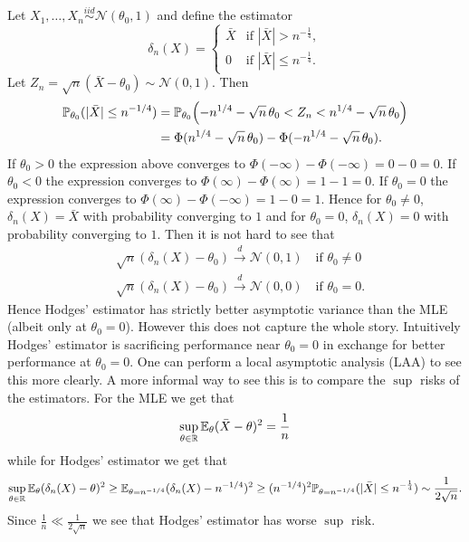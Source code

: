 \begin{example}
	Let $X_1, \dots, X_n \overset{iid}{\sim} \mathcal{N}(\theta_0, 1)$ and define the estimator $$
	\delta_n(X) = \begin{cases}
		\bar X & \text{if } |\bar X| > n^{-\frac{1}{4}}, \\
		0 & \text{if } |\bar X| \leq n^{-\frac{1}{4}}.
	\end{cases}
	$$ 
	Let $Z_n=\sqrt n(\bar X-\theta_0)\sim\mathcal N(0,1)$. Then
	\begin{align*}
	\mathbb{P}_{\theta_0}(|\bar X|\le n^{-1/4})
	&=
	\mathbb{P}_{\theta_0}\!\left(
	-n^{1/4}-\sqrt n\,\theta_0
	<Z_n<
	n^{1/4}-\sqrt n\,\theta_0
	\right) \\
	&=
	\Phi(n^{1/4}-\sqrt n\,\theta_0)
	-
	\Phi(-n^{1/4}-\sqrt n\,\theta_0).
	\end{align*}
	If $\theta_0 > 0$ the expression above converges to $\Phi(-\infty) - \Phi(-\infty) = 0 - 0 = 0$. If $\theta_0 < 0$ the expression converges to $\Phi(\infty) - \Phi(\infty) = 1 - 1 = 0$. If $\theta_0 = 0$ the expression converges to $\Phi(\infty) - \Phi(-\infty) = 1 - 0 = 1$. Hence for $\theta_0 \neq 0$, $\delta_n(X) = \bar X$ with probability converging to $1$ and for $\theta_0 = 0$, $\delta_n(X) = 0$ with probability converging to $1$. Then it is not hard to see that \begin{align*}
		&\sqrt{n} (\delta_n(X) - \theta_0) \overset{d}{\to} \mathcal{N}(0,1) \quad \text{if } \theta_0 \neq 0 \\
		&\sqrt{n} (\delta_n(X) - \theta_0) \overset{d}{\to} \mathcal{N}(0,0) \quad \text{if } \theta_0 = 0.
	\end{align*}
	Hence Hodges' estimator has strictly better asymptotic variance than the MLE (albeit only at $\theta_0 = 0$). However this does not capture the whole story. Intuitively Hodges' estimator is sacrificing performance near $\theta_0 = 0$ in exchange for better performance at $\theta_0 = 0$. One can perform a local asymptotic analysis (LAA) to see this more clearly. A more informal way to see this is to compare the $\sup$ risks of the estimators. For the MLE we get that \[
		\sup_{\theta \in \mathbb{R}} \mathbb{E}_{\theta} (\bar X - \theta)^2 = \frac{1}{n}
	\] while for Hodges' estimator we get that \[
		\sup_{\theta \in \mathbb{R}} \mathbb{E}_{\theta} (\delta_n(X) - \theta)^2 \geq \mathbb{E}_{\theta = n^{-1/4}} (\delta_n(X) - n^{-1/4})^2 \geq (n^{-1/4})^2 \mathbb{P}_{\theta = n^{-1/4}}(|\bar X| \leq n^{-\frac{1}{4}}) \sim \frac{1}{2\sqrt{n}}.
	\] Since $\frac{1}{n} \ll \frac{1}{2\sqrt{n}}$ we see that Hodges' estimator has worse $\sup$ risk.
\end{example}





